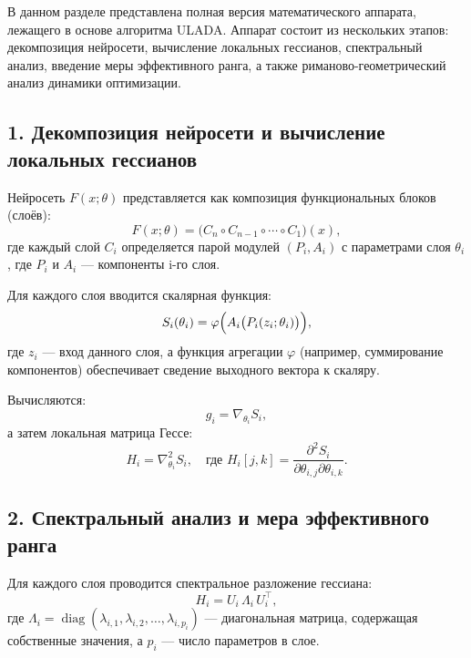\documentclass[a4paper,12pt]{article}
\begin{document}
В данном разделе представлена полная версия математического аппарата, лежащего в основе алгоритма ULADA. Аппарат состоит из нескольких этапов: декомпозиция нейросети, вычисление локальных гессианов, спектральный анализ, введение меры эффективного ранга, а также риманово-геометрический анализ динамики оптимизации.

\subsection*{1. Декомпозиция нейросети и вычисление локальных гессианов}

Нейросеть \( F(x;\theta) \) представляется как композиция функциональных блоков (слоёв):
\[
F(x;\theta) = \big( C_n \circ C_{n-1} \circ \cdots \circ C_1 \big)(x),
\]
где каждый слой \( C_i \) определяется парой модулей \((P_i, A_i)\) с параметрами слоя \(\theta_i\), где \(P_i\) и \(A_i\) --- компоненты i-го слоя.

Для каждого слоя вводится скалярная функция:
\[
S_i(\theta_i) = \varphi\Bigl(A_i\bigl(P_i(z_i;\theta_i)\bigr)\Bigr),
\]
где \( z_i \) --- вход данного слоя, а функция агрегации \(\varphi\) (например, суммирование компонентов) обеспечивает сведение выходного вектора к скаляру.

Вычисляются:
\[
g_i = \nabla_{\theta_i} S_i,
\]
а затем локальная матрица Гессе:
\[
H_i = \nabla^2_{\theta_i} S_i, \quad \text{где } H_i[j,k] = \frac{\partial^2 S_i}{\partial \theta_{i,j}\partial \theta_{i,k}}.
\]

\subsection*{2. Спектральный анализ и мера эффективного ранга}

Для каждого слоя проводится спектральное разложение гессиана:
\[
H_i = U_i\,\Lambda_i\,U_i^\top,
\]
где \(\Lambda_i = \operatorname{diag}(\lambda_{i,1}, \lambda_{i,2}, \dots, \lambda_{i,p_i})\) --- диагональная матрица, содержащая собственные значения, а \(p_i\) --- число параметров в слое.
\end{document}
